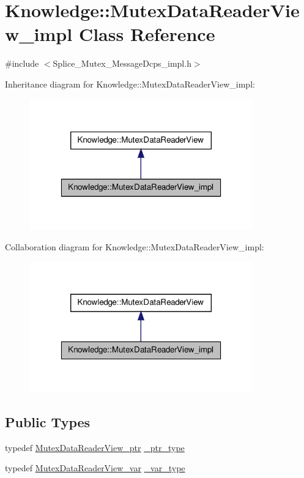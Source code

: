 \hypertarget{classKnowledge_1_1MutexDataReaderView__impl}{
\section{Knowledge::MutexDataReaderView\_\-impl Class Reference}
\label{d8/db2/classKnowledge_1_1MutexDataReaderView__impl}
}


{\ttfamily \#include $<$Splice\_\-Mutex\_\-MessageDcps\_\-impl.h$>$}



Inheritance diagram for Knowledge::MutexDataReaderView\_\-impl:
\nopagebreak
\begin{figure}[H]
\begin{center}
\leavevmode
\includegraphics[width=274pt]{db/d3d/classKnowledge_1_1MutexDataReaderView__impl__inherit__graph}
\end{center}
\end{figure}


Collaboration diagram for Knowledge::MutexDataReaderView\_\-impl:
\nopagebreak
\begin{figure}[H]
\begin{center}
\leavevmode
\includegraphics[width=274pt]{d6/dc1/classKnowledge_1_1MutexDataReaderView__impl__coll__graph}
\end{center}
\end{figure}
\subsection*{Public Types}
\begin{DoxyCompactItemize}
\item 
typedef \hyperlink{classKnowledge_1_1MutexDataReaderView}{MutexDataReaderView\_\-ptr} \hyperlink{classKnowledge_1_1MutexDataReaderView_a2cd6c0b2ff9b0ecf1e4e559634b68d18}{\_\-ptr\_\-type}
\item 
typedef \hyperlink{namespaceKnowledge_ab5f4ad419e160a86a63a5380e0ecaeb9}{MutexDataReaderView\_\-var} \hyperlink{classKnowledge_1_1MutexDataReaderView_ab34f732879f05d51fc25bf648bb464b3}{\_\-var\_\-type}
\end{DoxyCompactItemize}
